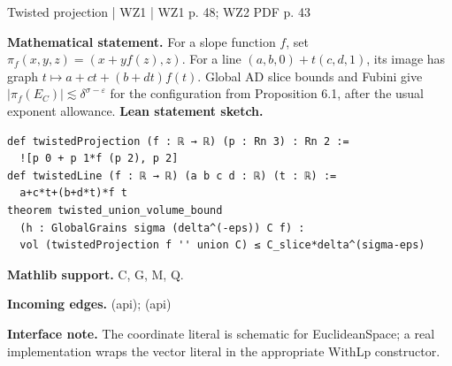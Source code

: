\documentclass[10pt,a4paper]{article}
\newcommand{\nodecard}[1]{\hyperlink{node-#1}{\texttt{\detokenize{#1}}}}
\begin{document}
\begin{minipage}{\linewidth}
\hypertarget{node-Dtwist}{}
\begin{tcolorbox}[colback=white,colframe=slopefg,colbacktitle=slopebg,coltitle=ink,boxrule=0.45pt,arc=1.6mm,left=3mm,right=3mm,top=2mm,bottom=2mm,title={\sffamily\bfseries WZ1 Def. 6.1 / WZ2 Sec. 6.5 \hfill \texttt{Dtwist}}]
{\sffamily\small\color{muted}Twisted projection | WZ1 | WZ1 p. 48; WZ2 PDF p. 43}\par
\textbf{Mathematical statement.} For a slope function $f$, set $\pi_f(x,y,z)=(x+yf(z),z)$.
For a line $(a,b,0)+t(c,d,1)$, its image has graph
$t\mapsto a+ct+(b+dt)f(t)$.
Global AD slice bounds and Fubini give $|\pi_f(E_C)|\lesssim\delta^{\sigma-\varepsilon}$ for the configuration from Proposition 6.1, after the usual exponent allowance.
\smallskip\textbf{Lean statement sketch.}
\begin{Verbatim}[fontsize=\small,breaklines=true,breakanywhere=true,tabsize=2]
def twistedProjection (f : ℝ → ℝ) (p : Rn 3) : Rn 2 :=
  ![p 0 + p 1*f (p 2), p 2]
def twistedLine (f : ℝ → ℝ) (a b c d : ℝ) (t : ℝ) :=
  a+c*t+(b+d*t)*f t
theorem twisted_union_volume_bound
  (h : GlobalGrains sigma (delta^(-eps)) C f) :
  vol (twistedProjection f '' union C) ≤ C_slice*delta^(sigma-eps)
\end{Verbatim}
{\footnotesize\textbf{Mathlib support.} C, G, M, Q.\par
\textbf{Incoming edges.} \nodecard{Igeom} (api); \nodecard{Icalc} (api)\par}
{\footnotesize\textbf{Interface note.} The coordinate literal is schematic for EuclideanSpace; a real implementation wraps the vector literal in the appropriate WithLp constructor.}
\end{tcolorbox}\end{minipage}\par\medskip
\end{document}
